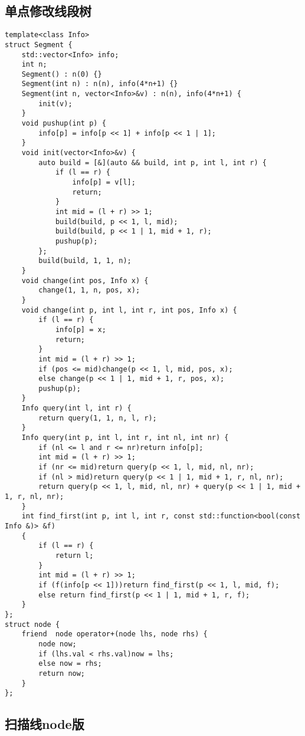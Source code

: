 \documentclass[a4paper,10pt]{article}
\begin{document}
\subsection{单点修改线段树}
\thispagestyle{fancy}

\noindent\begin{lstlisting}
template<class Info>
struct Segment {
    std::vector<Info> info;
    int n;
    Segment() : n(0) {}
    Segment(int n) : n(n), info(4*n+1) {}
    Segment(int n, vector<Info>&v) : n(n), info(4*n+1) {
        init(v);
    }
    void pushup(int p) {
        info[p] = info[p << 1] + info[p << 1 | 1];
    }
    void init(vector<Info>&v) {
        auto build = [&](auto && build, int p, int l, int r) {
            if (l == r) {
                info[p] = v[l];
                return;
            }
            int mid = (l + r) >> 1;
            build(build, p << 1, l, mid);
            build(build, p << 1 | 1, mid + 1, r);
            pushup(p);
        };
        build(build, 1, 1, n);
    }
    void change(int pos, Info x) {
        change(1, 1, n, pos, x);
    }
    void change(int p, int l, int r, int pos, Info x) {
        if (l == r) {
            info[p] = x;
            return;
        }
        int mid = (l + r) >> 1;
        if (pos <= mid)change(p << 1, l, mid, pos, x);
        else change(p << 1 | 1, mid + 1, r, pos, x);
        pushup(p);
    }
    Info query(int l, int r) {
        return query(1, 1, n, l, r);
    }
    Info query(int p, int l, int r, int nl, int nr) {
        if (nl <= l and r <= nr)return info[p];
        int mid = (l + r) >> 1;
        if (nr <= mid)return query(p << 1, l, mid, nl, nr);
        if (nl > mid)return query(p << 1 | 1, mid + 1, r, nl, nr);
        return query(p << 1, l, mid, nl, nr) + query(p << 1 | 1, mid + 1, r, nl, nr);
    }
    int find_first(int p, int l, int r, const std::function<bool(const Info &)> &f)
    {
        if (l == r) {
            return l;
        }
        int mid = (l + r) >> 1;
        if (f(info[p << 1]))return find_first(p << 1, l, mid, f);
        else return find_first(p << 1 | 1, mid + 1, r, f);
    }
};
struct node {
    friend  node operator+(node lhs, node rhs) {
        node now;
        if (lhs.val < rhs.val)now = lhs;
        else now = rhs;
        return now;
    }
};\end{lstlisting}

\subsection{扫描线node版}
\thispagestyle{fancy}
\end{document}
